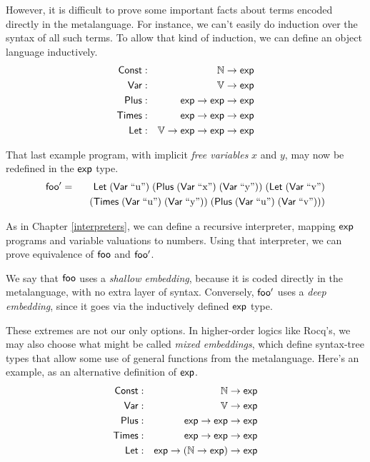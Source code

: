 \documentclass{amsbook}
\theoremstyle{definition}
\theoremstyle{remark}
\numberwithin{section}{chapter}
\numberwithin{equation}{chapter}
\begin{document}
However, it is difficult to prove some important facts about terms encoded directly in the metalanguage.
For instance, we can't easily do induction over the syntax of all such terms.
To allow that kind of induction, we can define an object language inductively.
\encoding
\begin{eqnarray*}
  \mathsf{Const} &:& \mathbb N \to \mathsf{exp} \\
  \mathsf{Var} &:& \mathbb V \to \mathsf{exp} \\
  \mathsf{Plus} &:& \mathsf{exp} \to \mathsf{exp} \to \mathsf{exp} \\
  \mathsf{Times} &:& \mathsf{exp} \to \mathsf{exp} \to \mathsf{exp} \\
  \mathsf{Let} &:& \mathbb V \to \mathsf{exp} \to \mathsf{exp} \to \mathsf{exp}
\end{eqnarray*}

That last example program, with implicit \emph{free variables} $x$ and $y$, may now be redefined in the $\mathsf{exp}$ type.
\newcommand{\var}[1]{\mt{Var} \; \textrm{``#1''}}
\begin{eqnarray*}
  \mt{foo'} &=& \mt{Let} \; (\var{u}) \; (\mt{Plus} \; (\var{x}) \; (\var{y})) \; (\mt{Let} \; (\var{v}) \\
  && \hspace{.1in} (\mt{Times} \; (\var{u}) \; (\var{y})) \; (\mt{Plus} \; (\var{u}) \; (\var{v})))
\end{eqnarray*}

As in Chapter \ref{interpreters}, we can define a recursive interpreter, mapping $\mathsf{exp}$ programs and variable valuations to numbers.
Using that interpreter, we can prove equivalence of $\mathsf{foo}$ and $\mathsf{foo'}$.

We say that $\mathsf{foo}$ uses a \emph{shallow embedding}, because it is coded directly in the metalanguage, with no extra layer of syntax.
Conversely, $\mathsf{foo'}$ uses a \emph{deep embedding}, since it goes via the inductively defined $\mathsf{exp}$ type.

These extremes are not our only options.
In higher-order logics like Rocq's, we may also choose what might be called \emph{mixed embeddings}, which define syntax-tree types that allow some use of general functions from the metalanguage.
Here's an example, as an alternative definition of $\mathsf{exp}$.
\encoding
\begin{eqnarray*}
  \mathsf{Const} &:& \mathbb N \to \mathsf{exp} \\
  \mathsf{Var} &:& \mathbb V \to \mathsf{exp} \\
  \mathsf{Plus} &:& \mathsf{exp} \to \mathsf{exp} \to \mathsf{exp} \\
  \mathsf{Times} &:& \mathsf{exp} \to \mathsf{exp} \to \mathsf{exp} \\
  \mathsf{Let} &:& \mathsf{exp} \to (\mathbb N \to \mathsf{exp}) \to \mathsf{exp}
\end{eqnarray*}
\end{document}
